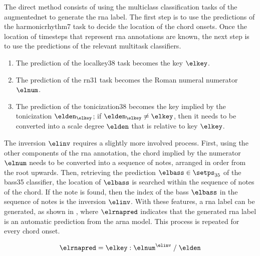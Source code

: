

The direct method consists of using the multiclass
classification tasks of the \gls{augmentednet} to generate
the \gls{rna} label. The first step is to use the
predictions of the \gls{harmonicrhythm7} task to decide the
location of the chord onsets. Once the location of timesteps
that represent \gls{rna} annotations are known, the next
step is to use the predictions of the relevant multitask
classifiers.

\begin{enumerate}
    \item[] The prediction of the \gls{localkey38} task
    becomes the key $\elkey$.
    \item[] The prediction of the \gls{rn31} task becomes
    the Roman numeral numerator $\elnum$.
    \item[] The prediction of the \gls{tonicization38}
    becomes the key implied by the tonicization
    $\elden_\elkey$; if $\elden_\elkey \neq \elkey$, then it
    needs to be converted into a scale degree $\elden$ that
    is relative to key $\elkey$.
\end{enumerate}

The inversion $\elinv$ requires a slightly more involved
process. First, using the other components of the \gls{rna}
annotation, the chord implied by the numerator $\elnum$
needs to be converted into a sequence of notes, arranged in
order from the root upwards. Then, retrieving the prediction
$\elbass \in \setps_{35}$ of the \gls{bass35} classifier,
the location of $\elbass$ is searched within the sequence of
notes of the chord. If the note is found, then the index of
the bass $\elbass$ in the sequence of notes is the inversion
$\elinv$. With these features, a \gls{rna} label can be
generated, as shown in , where
$\elrnapred$ indicates that the generated \gls{rna} label is
an automatic prediction from the \gls{arna} model. This
process is repeated for every chord onset.

\begin{equation}
    \label{eq:rna_direct}
    \elrnapred = \elkey : \elnum^{\elinv} \; / \; \elden
\end{equation}



